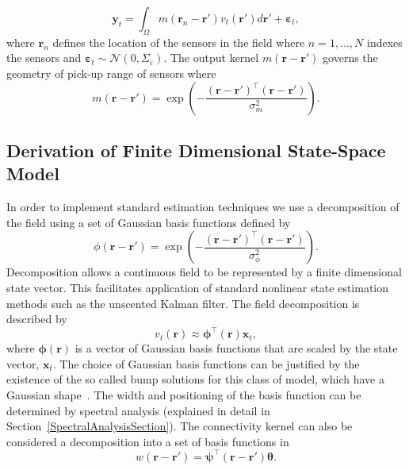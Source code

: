 \documentclass[12pt]{iopart}
\begin{document}
\begin{equation}
	\mathbf{y}_t = \int_{\Omega}{m\left(\mathbf{r}_n-\mathbf{r}'\right)v_t\left(\mathbf{r}'\right)d\mathbf{r}'} + \boldsymbol{\varepsilon}_t, 
\end{equation}
where $\mathbf{r}_n$ defines the location of the sensors in the field where $n=1,...,N$ indexes the sensors and $\boldsymbol{\varepsilon}_t \sim \mathcal{N}\left(0,\Sigma_{\varepsilon}\right)$. The output kernel $m(\mathbf{r}-\mathbf{r}')$ governs the geometry of pick-up range of sensors where 
\begin{equation}
	m\left(\mathbf{r}-\mathbf{r}'\right) = \exp{\left(-\frac{(\mathbf{r}-\mathbf{r}')^\top(\mathbf{r}-\mathbf{r}')}{\sigma_m^2}\right)}. 
\end{equation}

\subsection{Derivation of Finite Dimensional State-Space Model} 
In order to implement standard estimation techniques we use a decomposition of the field using a set of Gaussian basis functions defined by
\begin{equation}\label{eq:FieldBasisFunction}
	\phi\left(\mathbf{r}-\mathbf{r}'\right) =
\exp{\left(-\frac{(\mathbf{r}-\mathbf{r}')^\top(\mathbf{r}-\mathbf{r}')}{\sigma_{\phi}^2}\right)}. 
\end{equation}
 Decomposition allows a continuous field to be represented by a finite dimensional state vector. This facilitates application of standard nonlinear state estimation methods such as the unscented Kalman filter. The field decomposition is described by 
\begin{equation}
	\label{DefFieldDecomp} v_t\left(\mathbf{r}\right) \approx \boldsymbol{\phi}^{\top}\left(\mathbf{r}\right) \mathbf{x}_t, 
\end{equation}
where $\mathbf{\boldsymbol{\phi}}(\mathbf{r})$ is a vector of Gaussian basis functions that are scaled by the state vector, $\mathbf{x}_t$. The choice of Gaussian basis functions can be justified by the existence of the so called bump solutions for this class of model, which have a Gaussian shape~\cite{Coombes2005}. The width and positioning of the basis function can be determined by spectral analysis (explained in detail in Section~\ref{SpectralAnalysisSection}). The connectivity kernel can also be considered a decomposition into a set of basis functions in 
\begin{equation}\label{DefKernelDecomp}
	 w\left(\mathbf{r}-\mathbf{r}'\right) =\boldsymbol{\psi}^\top\left(\mathbf{r}-\mathbf{r}'\right) \boldsymbol{\theta}.
\end{equation}
\end{document}
